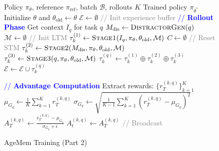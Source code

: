 \begin{figure}[!hbtp]
\begin{minipage}[t]{0.48\textwidth}
\begin{algorithm}[H]
\caption{AgeMem Training (Part 1)}
\label{alg:main-training}
\small
\begin{algorithmic}[1]
\Require Policy $\pi_{\theta}$, reference $\pi_{\text{ref}}$, batch $\mathcal{B}$, rollouts $K$
\Ensure Trained policy $\pi_{\theta^{*}}$
\State Initialize $\theta$ and $\theta_{\text{old}} \gets \theta$
    \State $\mathcal{E} \gets \emptyset$ \textcolor{gray}{// Init experience buffer}
    \State \textcolor{blue}{// \textbf{Rollout Phase}}
        \State Get context $I_q$ for task $q$
        \State $M_{\text{dis}} \gets \textsc{DistractorGen}(q)$ 
            \State $\mathcal{M} \gets \emptyset$ \textcolor{gray}{// Init LTM}
            \State $\tau_k^{(1)} \gets \textsc{Stage1}(I_q, \pi_{\theta}, \theta_{\text{old}}, \mathcal{M})$ 
            \State $C \gets \emptyset$ \textcolor{gray}{// Reset STM}
            \State $\tau_k^{(2)} \gets \textsc{Stage2}(M_{\text{dis}}, \pi_{\theta}, \theta_{\text{old}}, \mathcal{M})$ 
            \State $\tau_k^{(3)} \gets \textsc{Stage3}(q, \pi_{\theta}, \theta_{\text{old}}, \mathcal{M})$ 
            \State $\tau_k^{(q)} \gets \tau_k^{(1)} \oplus \tau_k^{(2)} \oplus \tau_k^{(3)}$ 
            \State $\mathcal{E} \gets \mathcal{E} \cup \tau_k^{(q)}$ 
        \EndFor
    \EndFor
\EndFor
\end{algorithmic}
\end{algorithm}
\end{minipage}
\hfill
\begin{minipage}[t]{0.48\textwidth}
\begin{algorithm}[H]
\caption{AgeMem Training (Part 2)}
\label{alg:main-training-2}
\small
\begin{algorithmic}[1]
\setcounter{ALG@line}{20}
\State \textcolor{blue}{// \textbf{Advantage Computation}}
    \State Extract rewards: $\{r_T^{(k,q)}\}_{k=1}^{K}$
    \State $\mu_{G_q} \gets \frac{1}{K}\sum_{k=1}^{K} r_T^{(k,q)}$
    \State $\sigma_{G_q} \gets \sqrt{\frac{1}{K-1}\sum_{k=1}^{K}(r_T^{(k,q)} - \mu_{G_q})^2}$
        \State $A_T^{(k,q)} \gets \frac{r_T^{(k,q)} - \mu_{G_q}}{\sigma_{G_q} + \epsilon}$ 
            \State $A_t^{(k,q)} \gets A_T^{(k,q)}$ \textcolor{gray}{// Broadcast}

\end{algorithmic}
\end{algorithm}
\end{minipage}
\end{figure}

